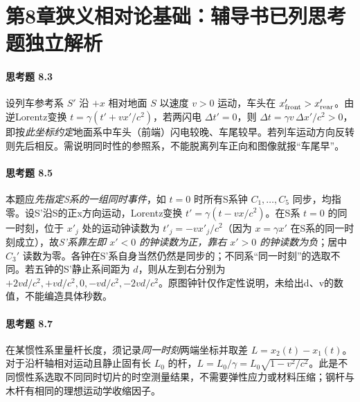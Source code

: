 \section*{第8章\quad 狭义相对论基础：辅导书已列思考题独立解析}
\paragraph{思考题 8.3}
设列车参考系 \(S'\) 沿 \(+x\) 相对地面 \(S\) 以速度 \(v>0\) 运动，车头在 \(x'_{\rm front}>x'_{\rm rear}\)。由逆Lorentz变换 \(t=\gamma(t'+vx'/c^2)\)，若两闪电 \(\Delta t'=0\)，则 \(\boxed{\Delta t=\gamma v\,\Delta x'/c^2>0}\)，即按\emph{此坐标约定}地面系中车头（前端）闪电较晚、车尾较早。若列车运动方向反转则先后相反。需说明同时性的参照系，不能脱离列车正向和图像就报“车尾早”。

\paragraph{思考题 8.5}
本题应\emph{先指定S系的一组同时事件}，如 \(t=0\) 时所有S系钟 \(C_1,\ldots,C_5\) 同步，均指零。设S'沿S的正x方向运动，Lorentz变换 \(t'=\gamma(t-vx/c^2)\)。在S系 \(t=0\) 的同一时刻，位于 \(x'_j\) 处的运动钟读数为 \(\boxed{t'_j=-v x'_j/c^2}\)（因为 \(x=\gamma x'\) 在S系的同一时刻成立），故\emph{S'系靠左即 \(x'<0\) 的钟读数为正，靠右 \(x'>0\) 的钟读数为负}；居中 \(C_3'\) 读数为零。各钟在S'系自身当然仍然是同步的；不同系“同一时刻”的选取不同。若五钟的S'静止系间距为 \(d\)，则从左到右分别为 \(+2vd/c^2,+vd/c^2,0,-vd/c^2,-2vd/c^2\)。原图钟针仅作定性说明，未给出d、v的数值，不能编造具体秒数。

\paragraph{思考题 8.7}
在某惯性系里量杆长度，须记录\emph{同一时刻}两端坐标并取差 \(L=x_2(t)-x_1(t)\)。对于沿杆轴相对运动且静止固有长 \(L_0\) 的杆，\(\boxed{L=L_0/\gamma=L_0\sqrt{1-v^2/c^2}}\)。此是不同惯性系选取不同同时切片的时空测量结果，不需要弹性应力或材料压缩；钢杆与木杆有相同的理想运动学收缩因子。
